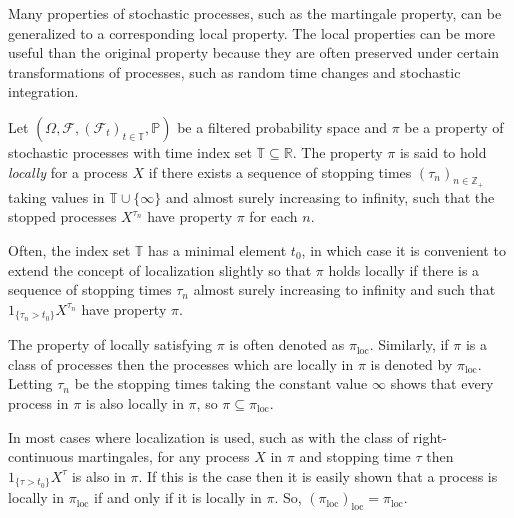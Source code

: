 \documentclass[12pt]{article}
\begin{document}

Many properties of stochastic processes, such as the martingale property, can be generalized to a corresponding local property. The local properties can be more useful than the original property because they are often preserved under certain transformations of processes, such as random time changes and stochastic integration.

Let  $(\Omega,\mathcal{F},(\mathcal{F}_t)_{t\in\mathbb{T}},\mathbb{P})$ be a filtered probability space and $\pi$ be a property of stochastic processes with time index set $\mathbb{T}\subseteq\mathbb{R}$.
The property $\pi$ is said to hold \emph{locally} for a process $X$ if there exists a sequence of stopping times $(\tau_n)_{n\in\mathbb{Z}_+}$ taking values in $\mathbb{T}\cup\{\infty\}$ and almost surely increasing to infinity, such that the stopped processes $X^{\tau_n}$ have property $\pi$ for each $n$.

Often, the index set $\mathbb{T}$ has a minimal element $t_0$, in which case it is convenient to extend the concept of localization slightly so that $\pi$ holds locally if there is a sequence of stopping times $\tau_n$ almost surely increasing to infinity and such that $1_{\{\tau_n> t_0\}}X^{\tau_n}$ have property $\pi$.

The property of locally satisfying $\pi$ is often denoted as $\pi_{\textrm{loc}}$. Similarly, if $\pi$ is a class of processes then the processes which are locally in $\pi$ is denoted by $\pi_{\textrm{loc}}$.
Letting $\tau_n$ be the stopping times taking the constant value $\infty$ shows that every process in $\pi$ is also locally in $\pi$, so $\pi\subseteq\pi_{\textrm{loc}}$.

In most cases where localization is used, such as with the class of right-continuous martingales, for any process $X$ in $\pi$ and stopping time $\tau$ then $1_{\{\tau>t_0\}}X^\tau$ is also in $\pi$. If this is the case then it is easily shown that a process is locally in $\pi_{\textrm{loc}}$ if and only if it is locally in $\pi$. So, $(\pi_{\textrm{loc}})_{\textrm{loc}}=\pi_{\textrm{loc}}$.
\end{document}
